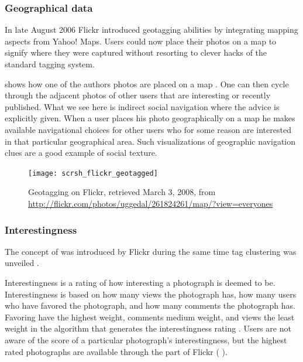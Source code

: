 \subsubsection{Geographical data}

In late August 2006 Flickr introduced geotagging abilities
\citep{butterfield06a} by integrating mapping aspects from Yahoo! Maps.%
Users could now place their photos on a
map to signify where they were captured without resorting to clever hacks of
the standard tagging system.

 shows how one of the authors photos are
placed on a map .
One can then cycle through the adjacent photos of other users
that are interesting or recently published.
What we see here is indirect social navigation where the advice is explicitly
given. When a user places his photo geographically on a map he makes available
navigational choices for other users who for some reason are interested in
that particular geographical area. Such visualizations of geographic
navigation clues are a good example of social texture.

\begin{figure}
  \texttt{[image: scrsh\_flickr\_geotagged]}
  \caption[Flickr Geotagging]{%
     Geotagging on Flickr,
     retrieved March 3, 2008, from
     \url{http://flickr.com/photos/uggedal/261824261/map/?view=everyones}}
  \label{figure:scrsh.flickr.geotagged}
\end{figure}

\subsubsection{Interestingness}
\label{section:analysis.flickr.interestingness}

The concept of  was introduced by Flickr during
the same time tag clustering was unveiled \citep{butterfield05}.

Interestingness is a rating of how interesting a photograph is deemed to be.
Interestingness is based on
how many views the photograph has, how many users who have favored the
photograph, and how many comments the photograph has. Favoring have the
highest weight, comments medium weight, and views the least weight
in the algorithm that generates the interestingness rating \citep{dean08}.
Users are not aware of the score of a particular photograph's interestingness,
but the highest rated photographs are available through the  part of
Flickr
(
).

